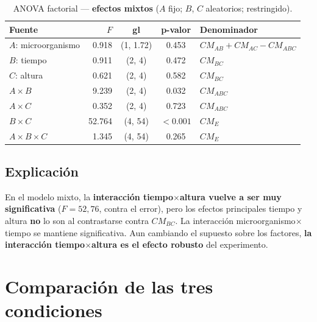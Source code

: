 \documentclass[12pt,a4paper]{article}
\begin{document}
\begin{table}[H]
\centering
\caption{ANOVA factorial --- \textbf{efectos mixtos} ($A$ fijo; $B$, $C$ aleatorios; restringido).}
\begin{tabular}{lrccl}
\toprule
\textbf{Fuente} & \textbf{$F$} & \textbf{gl} & \textbf{p-valor} & \textbf{Denominador}\\
\midrule
$A$: microorganismo & 0.918  & (1, 1.72) & 0.453 & $CM_{AB}+CM_{AC}-CM_{ABC}$\\
$B$: tiempo         & 0.911  & (2, 4)    & 0.472 & $CM_{BC}$\\
$C$: altura         & 0.621  & (2, 4)    & 0.582 & $CM_{BC}$\\
$A\times B$         & 9.239  & (2, 4)    & 0.032 & $CM_{ABC}$\\
$A\times C$         & 0.352  & (2, 4)    & 0.723 & $CM_{ABC}$\\
$B\times C$         & 52.764 & (4, 54)   & $<0.001$ & $CM_{E}$\\
$A\times B\times C$ & 1.345  & (4, 54)   & 0.265 & $CM_{E}$\\
\bottomrule
\end{tabular}
\end{table}

\subsection{Explicación}

En el modelo mixto, la \textbf{interacción tiempo$\times$altura vuelve a ser muy significativa} ($F=52{,}76$, contra el error), pero los efectos principales tiempo y altura \textbf{no} lo son al contrastarse contra $CM_{BC}$. La interacción microorganismo$\times$tiempo se mantiene significativa. Aun cambiando el supuesto sobre los factores, \textbf{la interacción tiempo$\times$altura es el efecto robusto} del experimento.

\section{Comparación de las tres condiciones}
\end{document}
